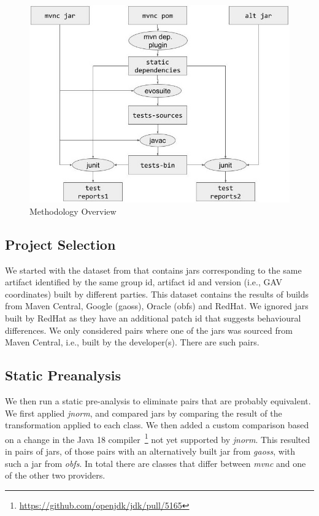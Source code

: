\documentclass[conference]{IEEEtran}
\newcommand{\inputgen}[1]{\unskip}
\begin{document}
\begin{figure}[ht!]
	\centering
	\includegraphics[width=\columnwidth]{methodology.jpg}
	\caption{Methodology Overview \label{fig:methodology}}
\end{figure}


\subsection{Project Selection}

We started with the dataset from \cite{dietrich2024levelsbinaryequivalencecomparison} that contains jars corresponding to the same artifact identified by the same group id, artifact id and version (i.e., GAV coordinates) built by different parties. This dataset contains the results of builds from Maven Central, Google (gaoss), Oracle (obfs) and  RedHat. We ignored jars built by RedHat as they have an additional patch id that suggests behavioural differences.  We only considered pairs where one of the jars was sourced from Maven Central, i.e., built by the developer(s). There are \inputgen{num-pairs-of-binaries} such pairs.


\subsection{Static Preanalysis}

We then run a static pre-analysis to eliminate pairs that are probably equivalent. We first applied \textit{jnorm}, and compared jars by comparing the result of the transformation applied to each class. We then added a custom comparison based on a change in the Java 18 compiler~\footnote{\url{https://github.com/openjdk/jdk/pull/5165}} not yet supported by \textit{jnorm}. This resulted in \inputgen{num-jar-pairs-after-invokevirtual-invokeinterface} pairs of jars, \inputgen{num-jar-pairs-after-invokevirtual-invokeinterface-gaoss} of those pairs with an alternatively built jar from \textit{gaoss}, \inputgen{num-jar-pairs-after-invokevirtual-invokeinterface-obfs} with such a jar from \textit{obfs}.
In total there are \inputgen{num-class-pairs-after-invokevirtual-invokeinterface} classes that differ between \textit{mvnc} and one of the other two providers.
\end{document}
